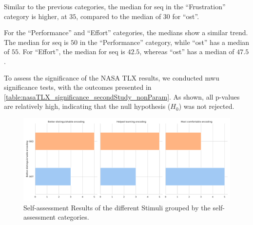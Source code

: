 Similar to the previous categories, the median for \gls{seq} in the \enquote{Frustration} category is higher, at $35$, compared to the median of $30$ for \enquote{ost}.

For the \enquote{Performance} and \enquote{Effort} categories, the medians show a similar trend. The median for \gls{seq} is $50$ in the \enquote{Performance} category, while \enquote{ost} has a median of $55$. For \enquote{Effort}, the median for \gls{seq} is $42.5$, whereas \enquote{ost} has a median of $47.5$.

To assess the significance of the NASA TLX results, we conducted \gls{mwu} significance tests, with the outcomes presented in \autoref{table:nasaTLX_significance_secondStudy_nonParam}. As shown, all p-values are relatively high, indicating that the null hypothesis ($H_0$) was not rejected.

\begin{table}[ht]
\caption{Results of \gls{mwu} significance tests for the different NasaTLX dimensions with Cohens d.}
\label{table:nasaTLX_significance_secondStudy_nonParam}
\end{table}

\begin{figure}
    \centering
    \includegraphics[width=\linewidth]{src/pictures/Study2Data_questionnaire/questions_special_study2.pdf}
    \caption{Self-assessment Results of the different Stimuli grouped by the self-assessment categories.}
    \label{fig:questions_individual_secondStudy}
\end{figure}

